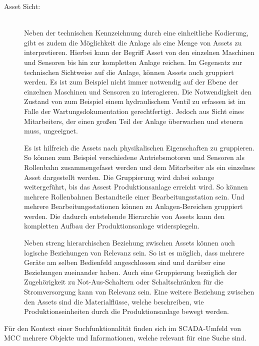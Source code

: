 \begin{description}
    \item[Asset Sicht:]\hfill \\
    Neben der technischen Kennzeichnung durch eine einheitliche Kodierung, gibt es zudem die Möglichkeit die Anlage als eine Menge von \glqq Assets\grqq{} zu interpretieren. Hierbei kann der Begriff \glqq Asset\grqq{} von den einzelnen Maschinen und Sensoren bis hin zur kompletten Anlage reichen. Im Gegensatz zur technischen Sichtweise auf die Anlage, können Assets auch gruppiert werden. Es ist zum Beispiel nicht immer notwendig auf der Ebene der einzelnen Maschinen und Sensoren zu interagieren. Die Notwendigkeit den Zustand von zum Beispiel einem hydraulischem Ventil zu erfassen ist im Falle der Wartungsdokumentation gerechtfertigt. Jedoch aus Sicht eines Mitarbeiters, der einen großen Teil der Anlage überwachen und steuern muss, ungeeignet.

    Es ist hilfreich die Assets nach physikalischen Eigenschaften zu gruppieren. So können zum Beispiel verschiedene Antriebsmotoren und Sensoren als \glqq Rollenbahn\grqq{} zusammengefasst werden und dem Mitarbeiter als ein einzelnes Asset dargestellt werden. Die Gruppierung wird dabei solange weitergeführt, bis das Assest \glqq Produktionsanlage\grqq{} erreicht wird. So können mehrere \glqq Rollenbahnen\grqq{} Bestandteile einer \glqq Bearbeitungsstation\grqq{} sein. Und mehrere \glqq Bearbeitungsstationen\grqq{} können zu \glqq Anlagen-Bereichen\grqq{} gruppiert werden. Die dadurch entstehende Hierarchie von Assets kann den kompletten Aufbau der Produktionsanlage widerspiegeln.

    Neben streng hierarchischen Beziehung zwischen Assets können auch logische Beziehungen von Relevanz sein. So ist es möglich, dass mehrere Geräte am selben Bedienfeld angeschlossen sind und darüber eine Beziehungen zueinander haben. Auch eine Gruppierung bezüglich der Zugehörigkeit zu Not-Aus-Schaltern oder Schaltschränken für die Stromversorgung kann von Relevanz sein. Eine weitere Beziehung zwischen den Assets sind die Materialflüsse, welche beschreiben, wie Produktionseinheiten durch die Produktionsanlage bewegt werden.
    
\end{description}

Für den Kontext einer Suchfunktionalität finden sich im SCADA-Umfeld von MCC mehrere Objekte und Informationen, welche relevant für eine Suche sind.

